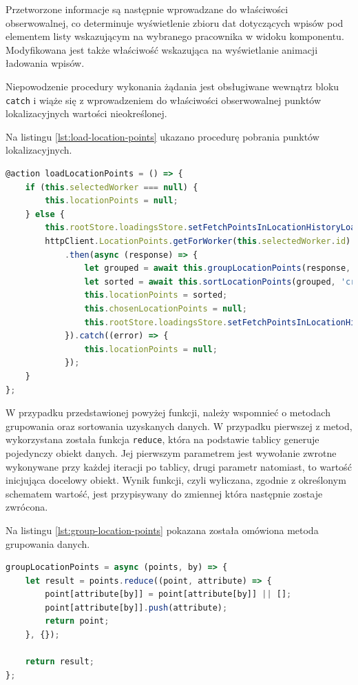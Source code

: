 Przetworzone informacje są następnie wprowadzane do właściwości obserwowalnej, co determinuje wyświetlenie zbioru dat dotyczących wpisów pod elementem listy wskazującym na wybranego pracownika w widoku komponentu. Modyfikowana jest także właściwość wskazująca na wyświetlanie animacji ładowania wpisów.

Niepowodzenie procedury wykonania żądania jest obsługiwane wewnątrz bloku \texttt{catch} i wiąże się z wprowadzeniem do właściwości obserwowalnej punktów lokalizacyjnych wartości nieokreślonej.

Na listingu \ref{lst:load-location-points} ukazano procedurę pobrania punktów lokalizacyjnych.

\begin{lstlisting}[label=lst:load-location-points,caption=Kod akcji pobierającej listę punktów lokalizacyjnych dla pracownika, captionpos=b,basicstyle=\footnotesize\ttfamily,language=JavaScript]
@action loadLocationPoints = () => {
	if (this.selectedWorker === null) {
		this.locationPoints = null;
	} else {
		this.rootStore.loadingsStore.setFetchPointsInLocationHistoryLoading(true);
		httpClient.LocationPoints.getForWorker(this.selectedWorker.id)
			.then(async (response) => {
				let grouped = await this.groupLocationPoints(response, 'date');
				let sorted = await this.sortLocationPoints(grouped, 'created');
				this.locationPoints = sorted;
				this.chosenLocationPoints = null;
				this.rootStore.loadingsStore.setFetchPointsInLocationHistoryLoading(false);
			}).catch((error) => {
				this.locationPoints = null;
			});
	}
};
\end{lstlisting}

W przypadku przedstawionej powyżej funkcji, należy wspomnieć o metodach grupowania oraz sortowania uzyskanych danych. W przypadku pierwszej z metod, wykorzystana została funkcja \texttt{reduce}, która na podstawie tablicy generuje pojedynczy obiekt danych. Jej pierwszym parametrem jest wywołanie zwrotne wykonywane przy każdej iteracji po tablicy, drugi parametr natomiast, to wartość inicjująca docelowy obiekt. Wynik funkcji, czyli wyliczana, zgodnie z określonym schematem wartość, jest przypisywany do zmiennej która następnie zostaje zwrócona.

Na listingu \ref{lst:group-location-points} pokazana została omówiona metoda grupowania danych.

\begin{lstlisting}[label=lst:group-location-points,caption=Kod metody grupującej uzyskane punkty lokalizacyjne, captionpos=b,basicstyle=\footnotesize\ttfamily,language=JavaScript]
groupLocationPoints = async (points, by) => {
	let result = points.reduce((point, attribute) => {
		point[attribute[by]] = point[attribute[by]] || [];
		point[attribute[by]].push(attribute);
		return point;
	}, {});

	return result;
};
\end{lstlisting}

